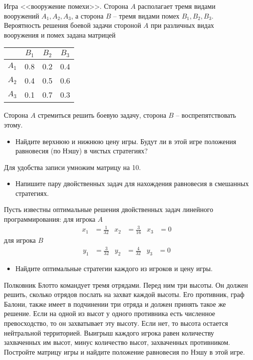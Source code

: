 \begin{exercise}
Игра <<вооружение помехи>>. Сторона $A$ располагает тремя видами вооружений
$A_1,A_2,A_3$, а сторона $B$ -- тремя видами помех $B_1,B_2,B_3$. Вероятность решения
боевой задачи стороной $A$ при различных видах вооружения и помех задана матрицей
\begin{center}
	\begin{tabular}{|c|c|c|c|}\hline
	& $B_1$ & $B_2$ & $B_3$ \\ \hline
	$A_1$ & 0.8 & 0.2 & 0.4 \\ \hline
	$A_2$ & 0.4 & 0.5 & 0.6 \\ \hline
	$A_3$ & 0.1 & 0.7 & 0.3 \\ \hline
	\end{tabular}
\end{center}
Сторона $A$ стремиться решить боевую задачу, сторона $B$ -- воспрепятствовать этому.
\begin{itemize}
	\item Найдите верхнюю и нижнюю цену игры. Будут ли в этой игре положения равновесия
	(по Нэшу) в чистых стратегиях?
\end{itemize}
Для удобства записи умножим матрицу на 10.
\begin{itemize}
	\item Напишите пару двойственных задач для нахождения равновесия в смешанных стратегиях.
\end{itemize}
Пусть известны оптимальные решения двойственных задач линейного программирования:
для игрока $A$
\begin{align*}
	x_1&=\frac{1}{32} & x_2&=\frac{3}{16} & x_3&=0
\end{align*}
для игрока $B$
\begin{align*}
	y_1&=\frac{3}{32} & y_2&=\frac{4}{32} & y_3&=0
\end{align*}
\begin{itemize}
	\item Найдите оптимальные стратегии каждого из игроков и цену игры.
\end{itemize}
\end{exercise}

\begin{exercise}
Полковник Блотто командует тремя отрядами. Перед ним три высоты.
Он должен решить, сколько отрядов послать на захват каждой высоты.
Его противник, граф Балони, также имеет в подчинении три отряда и должен принять такое же решение. 
Если на одной из высот у одного противника есть численное превосходство, то он захватывает эту высоту. 
Если нет, то высота остается нейтральной территорией. 
Выигрыш каждого игрока равен количеству захваченных им высот, 
минус количество высот, захваченных противником. 
Постройте матрицу игры и найдите положение равновесия по Нэшу в этой игре.
\end{exercise}


